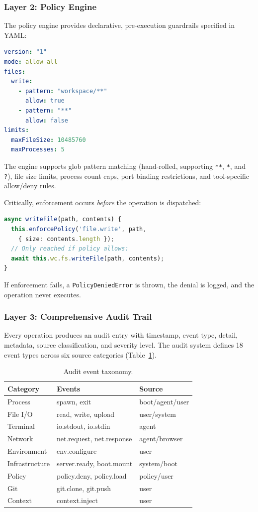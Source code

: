 \documentclass[11pt,twocolumn]{article}
\begin{document}
\subsubsection{Layer 2: Policy Engine}

The policy engine provides declarative, pre-execution guardrails specified in YAML:

\begin{lstlisting}[language=YAML]
version: "1"
mode: allow-all
files:
  write:
    - pattern: "workspace/**"
      allow: true
    - pattern: "**"
      allow: false
limits:
  maxFileSize: 10485760
  maxProcesses: 5
\end{lstlisting}

The engine supports glob pattern matching (hand-rolled, supporting \texttt{**}, \texttt{*}, and \texttt{?}), file size limits, process count caps, port binding restrictions, and tool-specific allow/deny rules.

Critically, enforcement occurs \emph{before} the operation is dispatched:

\begin{lstlisting}[language=TypeScript]
async writeFile(path, contents) {
  this.enforcePolicy('file.write', path,
    { size: contents.length });
  // Only reached if policy allows:
  await this.wc.fs.writeFile(path, contents);
}
\end{lstlisting}

If enforcement fails, a \texttt{PolicyDeniedError} is thrown, the denial is logged, and the operation never executes.

\subsubsection{Layer 3: Comprehensive Audit Trail}

Every operation produces an audit entry with timestamp, event type, detail, metadata, source classification, and severity level. The audit system defines 18 event types across six source categories (Table~\ref{tab:audit}).

\begin{table}[H]
\centering
\caption{Audit event taxonomy.}
\label{tab:audit}
\scriptsize
\begin{tabular}{@{}lll@{}}
\toprule
\textbf{Category} & \textbf{Events} & \textbf{Source} \\
\midrule
Process & spawn, exit & boot/agent/user \\
File I/O & read, write, upload & user/system \\
Terminal & io.stdout, io.stdin & agent \\
Network & net.request, net.response & agent/browser \\
Environment & env.configure & user \\
Infrastructure & server.ready, boot.mount & system/boot \\
Policy & policy.deny, policy.load & policy/user \\
Git & git.clone, git.push & user \\
Context & context.inject & user \\
\bottomrule
\end{tabular}
\end{table}
\end{document}
